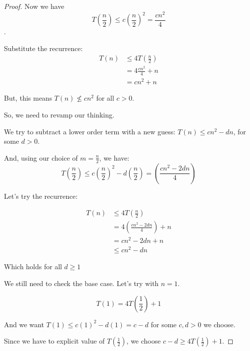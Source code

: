 \documentclass[12pt,letterpaper]{article}
\begin{document}
\begin{enumerate}
\begin{enumerate}
\begin{enumerate}
\begin{proof}
                Now we have
                \[T\left(\frac{n}{2}\right) \le c\left(\frac{n}{2}\right)^2 = \frac{cn^2}{4}\].

                Substitute the recurrence:
                \begin{align*}
                  T(n) &\le 4T\left(\frac{n}{2}\right) \\
                  &= 4\frac{cn^2}{4} + n \\
                  &= cn^2 + n
                \end{align*}

                But, this means $T(n) \nleq cn^2$ for all $c > 0$.

                So, we need to revamp our thinking.

                We try to subtract a lower order term with a new guess: $T(n) \le cn^2 - dn$, for some $d > 0$.

                And, using our choice of $m = \frac{n}{2}$, we have:
                \[
                  T\left(\frac{n}{2}\right) \le c\left(\frac{n}{2}\right)^2 - d\left(\frac{n}{2}\right) = \left(\frac{cn^2-2dn}{4}\right)
                \]

                Let's try the recurrence:

                \begin{align*}
                  T(n) &\le 4T\left(\frac{n}{2}\right) \\
                  &= 4\left(\frac{cn^2-2dn}{4}\right) + n \\
                  &= cn^2 - 2dn + n \\
                  &\le cn^2 - dn
                \end{align*}

                Which holds for all $d \ge 1$

                We still need to check the base case.
                Let's try with $n = 1$.

                \[
                  T(1) = 4T\left(\frac{1}{2}\right) + 1
                \]

                And we want $T(1) \le c(1)^2 - d(1) = c - d$ for some $c,d > 0$ we choose.

                Since we have to explicit value of $T\left(\frac{1}{2}\right)$,
                we choose $c - d \ge 4T\left(\frac{1}{2}\right) + 1 $.


\end{proof}
\end{enumerate}
\end{enumerate}
\end{enumerate}
\end{document}
